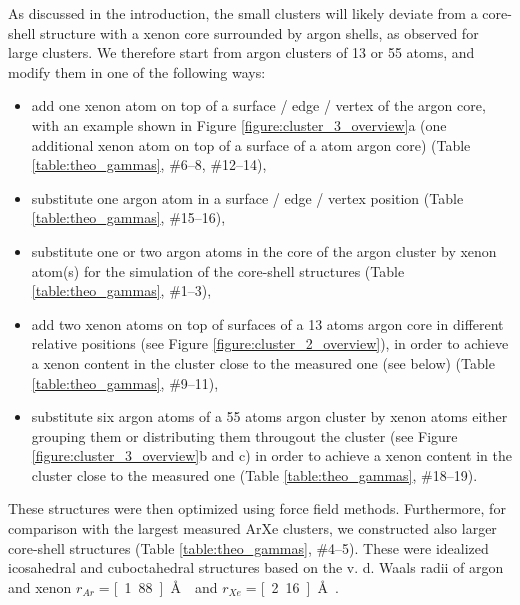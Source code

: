 \documentclass[journal=jpccck,manuscript=article]{achemso}
\begin{document}
As discussed in the introduction, the small clusters will likely
deviate from a core-shell structure with a xenon core surrounded
by argon shells, as observed for large clusters.\cite{tchaplyguinearxe,Vach_1999} We therefore start from
argon clusters of 13 or 55 atoms, and modify them in one of the following
ways:
%
\begin{itemize}
 \item add one xenon atom on top of a surface / edge / vertex of
       the argon core, with an example shown in
       Figure \ref{figure:cluster_3_overview}a
       (one additional xenon atom
       on top of a surface of a \unit[55]{atom} argon core)
       (Table \ref{table:theo_gammas}, \#6--8, \#12--14),
 \item substitute one argon atom in a surface / edge / vertex position
       (Table \ref{table:theo_gammas}, \#15--16),
 \item substitute one or two argon atoms in the core of the argon cluster
       by xenon atom(s) for the simulation of the core-shell structures
       (Table \ref{table:theo_gammas}, \#1--3),
 \item add two xenon atoms on top of surfaces of a 13 atoms argon core
       in different relative positions (see Figure
       \ref{figure:cluster_2_overview}),
       in order to achieve a xenon content in the cluster close to the
       measured one (see below)
       (Table \ref{table:theo_gammas}, \#9--11),
 \item substitute six argon atoms of a 55 atoms argon cluster by xenon
       atoms either grouping them or distributing them througout the cluster
       (see Figure \ref{figure:cluster_3_overview}b and c) in order to
       achieve a xenon content in the cluster close to the measured one
       (Table \ref{table:theo_gammas}, \#18--19).
\end{itemize}

These structures were then optimized using force field methods.
%
Furthermore, for comparison with the largest measured ArXe clusters, we constructed also larger core-shell structures (Table \ref{table:theo_gammas}, \#4--5).
These were idealized icosahedral and cuboctahedral structures based on the
v. d. Waals radii of argon and xenon $r_{Ar}=$\unit[1.88]{\AA} \cite{Herman88}
and $r_{Xe}=$\unit[2.16]{\AA} \cite{Freeman74}.

\end{document}
